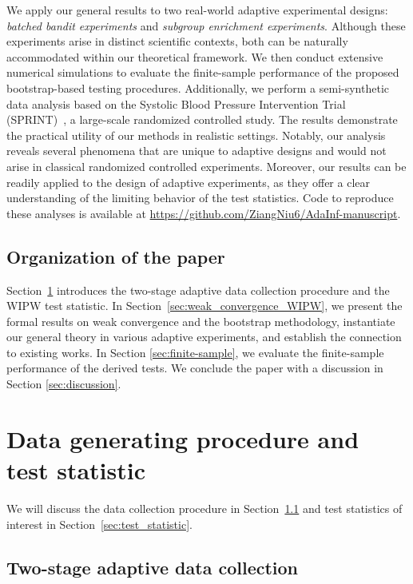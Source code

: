 \documentclass[12pt]{article}
\begin{document}
We apply our general results to two real-world adaptive experimental designs: \emph{batched bandit experiments} and \emph{subgroup enrichment experiments}. Although these experiments arise in distinct scientific contexts, both can be naturally accommodated within our theoretical framework. We then conduct extensive numerical simulations to evaluate the finite-sample performance of the proposed bootstrap-based testing procedures. Additionally, we perform a semi-synthetic data analysis based on the Systolic Blood Pressure Intervention Trial (SPRINT)~\citep{ambrosius2014design}, a large-scale randomized controlled study. The results demonstrate the practical utility of our methods in realistic settings. Notably, our analysis reveals several phenomena that are unique to adaptive designs and would not arise in classical randomized controlled experiments. Moreover, our results can be readily applied to the design of adaptive experiments, as they offer a clear understanding of the limiting behavior of the test statistics. Code to
reproduce these analyses is available at \url{https://github.com/ZiangNiu6/AdaInf-manuscript}.


\subsection{Organization of the paper}

Section~\ref{sec:warmup} introduces the two-stage adaptive data collection procedure and the WIPW test statistic. 
In Section~\ref{sec:weak_convergence_WIPW}, 
we present the formal results on weak convergence and the bootstrap methodology, instantiate our general theory in various adaptive experiments, 
and establish the connection to existing works. 
In Section \ref{sec:finite-sample}, we evaluate the finite-sample performance of the derived tests. We conclude the paper with a discussion in Section \ref{sec:discussion}.


\section{Data generating procedure and test statistic}\label{sec:warmup}


We will discuss the data collection procedure in Section~\ref{sec:data_collection_selection} and test statistics of interest in Section~\ref{sec:test_statistic}.

\subsection{Two-stage adaptive data collection}\label{sec:data_collection_selection}
\end{document}
